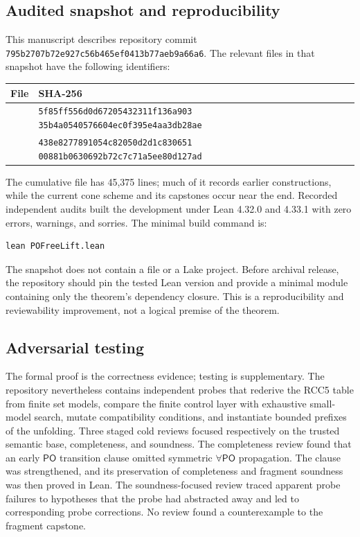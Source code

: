 \documentclass[11pt]{article}
\theoremstyle{plain}
\theoremstyle{definition}
\theoremstyle{remark}
\newcommand{\PO}{\ensuremath{\mathsf{PO}}}
\newcommand{\code}[1]{\texttt{#1}}
\begin{document}
\subsection{Audited snapshot and reproducibility}

This manuscript describes repository commit
\code{795b2707b72e927c56b465ef0413b77aeb9a66a6}.  The relevant files in that
snapshot have the following identifiers:

\begin{center}
\small
\begin{tabularx}{\textwidth}{@{}lY@{}}
\toprule
File & SHA-256\\
\midrule
{} &
\code{5f85ff556d0d67205432311f136a903}\allowbreak
\code{35b4a0540576604ec0f395e4aa3db28ae}\\
 &
\code{438e8277891054c82050d2d1c830651}\allowbreak
\code{00881b0630692b72c7c71a5ee80d127ad}\\
\bottomrule
\end{tabularx}
\end{center}

The cumulative  file has 45,375 lines; much of it records
earlier constructions, while the current cone scheme and its capstones occur
near the end.  Recorded independent audits built the development under Lean
4.32.0 and 4.33.1 with zero errors, warnings, and sorries.  The minimal build
command is:
\begin{lstlisting}
lean POFreeLift.lean
\end{lstlisting}
The snapshot does not contain a  file or a Lake project.
Before archival release, the repository should pin the tested Lean version and
provide a minimal module containing only the theorem's dependency closure.
This is a reproducibility and reviewability improvement, not a logical premise
of the theorem.

\subsection{Adversarial testing}

The formal proof is the correctness evidence; testing is supplementary.  The
repository nevertheless contains independent probes that rederive the RCC5
table from finite set models, compare the finite control layer with exhaustive
small-model search, mutate compatibility conditions, and instantiate bounded
prefixes of the unfolding.  Three staged cold reviews focused respectively on
the trusted semantic base, completeness, and soundness.  The completeness
review found that an early $\PO$ transition clause omitted symmetric
$\forall\PO$ propagation.  The clause was strengthened, and its preservation
of completeness and fragment soundness was then proved in Lean.  The
soundness-focused review traced apparent probe failures to hypotheses that the
probe had abstracted away and led to corresponding probe corrections.  No
review found a counterexample to the fragment capstone.
\end{document}
